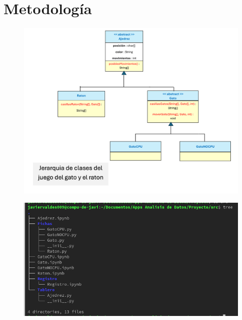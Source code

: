 \documentclass[12pt, Tahoma]{article}
\begin{document}
	\section*{Metodología}
	\begin{figure}[H]
		\centering
		\includegraphics[scale=0.6]{gatoRaton.png}
	\end{figure}
	\begin{figure}[H]
		\centering
		\includegraphics[scale=0.6]{Paquetes.png}
	\end{figure}
	
\end{document}
